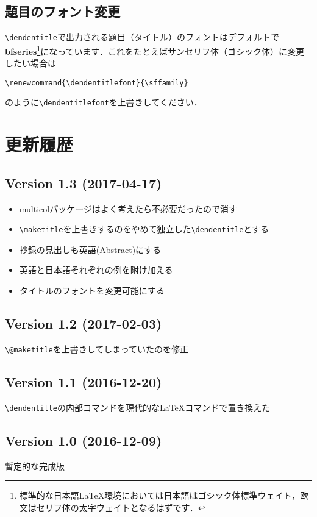 \documentclass[uplatex,a4paper]{jsarticle}
\begin{document}
\subsection{題目のフォント変更}

\verb|\dendentitle|で出力される題目（タイトル）のフォントはデフォルトで\textbf{bfseries}\footnote{標準的な日本語{\LaTeX}環境においては日本語はゴシック体標準ウェイト，欧文はセリフ体の太字ウェイトとなるはずです．}になっています．これをたとえばサンセリフ体（ゴシック体）に変更したい場合は
\begin{verbatim}
\renewcommand{\dendentitlefont}{\sffamily}
\end{verbatim}
のように\verb|\dendentitlefont|を上書きしてください．

\section{更新履歴}

\subsection*{Version 1.3 (2017-04-17)}
\begin{itemize}
\item multicolパッケージはよく考えたら不必要だったので消す
\item \verb|\maketitle|を上書きするのをやめて独立した\verb|\dendentitle|とする
\item 抄録の見出しも英語(Abstract)にする
\item 英語と日本語それぞれの例を附け加える
\item タイトルのフォントを変更可能にする
\end{itemize}

\subsection*{Version 1.2 (2017-02-03)}
\verb|\@maketitle|を上書きしてしまっていたのを修正


\subsection*{Version 1.1 (2016-12-20)}
\verb|\dendentitle|の内部コマンドを現代的なLaTeXコマンドで置き換えた

\subsection*{Version 1.0 (2016-12-09)}
暫定的な完成版
\end{document}
